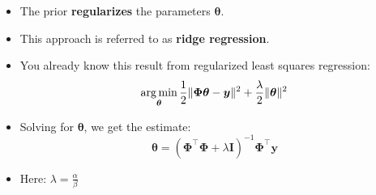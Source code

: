 \begin{frame}
	\begin{itemize}
		\item The prior \textbf{regularizes} the parameters $\bm{\theta}$.
		\item This approach is referred to as \textbf{ridge regression}.
		\item You already know this result from regularized least squares regression:
		\begin{equation}
			\operatorname*{arg\,min}_{\bm{\theta}} \frac{1}{2} \Vert \bm{\Phi} \bm{\theta} - \bm{y} \Vert^2 + \frac{\lambda}{2} \Vert \bm{\theta} \Vert^2
		\end{equation}
		\item Solving for $\bm{\theta}$, we get the estimate:
		\begin{equation}
			\bm{\theta} = (\bm{\Phi}^{\intercal} \bm{\Phi} + \lambda \bm{I})^{-1} \bm{\Phi}^{\intercal} \bm{y}
		\end{equation}
		\item Here: $\lambda = \frac{\alpha}{\beta}$
	\end{itemize}
	
\end{frame}


